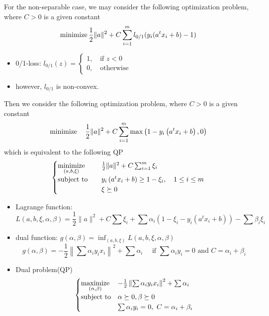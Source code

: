 \begin{remark}
    For the non-separable case, we may consider the following optimization problem, where $C > 0$ is a given constant\[\operatorname{minimize} \frac{1}{2}\|a\|^2 + C\sum_{i = 1}^ml_{0 / 1}(y_i(a^tx_i + b) - 1)\]
    \begin{itemize}
        \item 0/1-loss: $l_{0/1}(z) = \begin{cases}
            1,\quad \text{if } z < 0\\
            0,\quad \text{otherwise}
        \end{cases}$
        \item however, $l_{0/1}$ is non-convex.
    \end{itemize}
    
    Then we consider the following optimization problem, where $C > 0$ is a given constant\[\operatorname{minimize} \quad \frac{1}{2}\|a\|^{2}+C \sum_{i=1}^{m} \max \left(1-y_{i}\left(a^{t} x_{i}+b\right), 0\right)\] which is equivalent to the following QP\[\begin{cases}
        \underset{(a, b, \xi)}{\operatorname{minimize}} \quad &\frac{1}{2}\|a\|^{2}+C \sum_{i=1}^{m} \xi_{i} \\
        \operatorname{subject\ to} \quad &y_{i}\left(a^{t} x_{i}+b\right) \geq 1-\xi_{i}, \quad 1 \leq i \leq m \\
        &\xi \succeq 0
    \end{cases}\]
    \begin{itemize}
        \item Lagrange function: \[L(a, b, \xi, \alpha, \beta)=\frac{1}{2}\|a\|^{2}+C \sum \xi_{i}+\sum \alpha_{i}\left(1-\xi_{i}-y_{i}\left(a^{t} x_{i}+b\right)\right)-\sum \beta_{i} \xi_{i}\]
        \item dual function: $g(\alpha, \beta) = \inf_{(a, b, \xi)} L(a, b, \xi, \alpha, \beta)$\[g(\alpha, \beta)=-\frac{1}{2}\left\|\sum \alpha_{i} y_{i} x_{i}\right\|^{2}+\sum \alpha_{i}\quad  \text { if } \sum \alpha_{i} y_{i}=0 \text { and } C=\alpha_{i}+\beta_{i}\]
        \item Dual problem(QP)\[\begin{cases}
            \underset{(\alpha, \beta)}{\operatorname{maximize}} & -\frac{1}{2}\left\|\sum \alpha_{i} y_{i} x_{i}\right\|^{2}+\sum \alpha_{i} \\
            \operatorname{subject\ to} & \alpha \succeq 0, \beta \succeq 0 \\
            & \sum \alpha_{i} y_{i}=0,\ C=\alpha_{i}+\beta_{i}
        \end{cases}\]

\end{itemize}
\end{remark}
